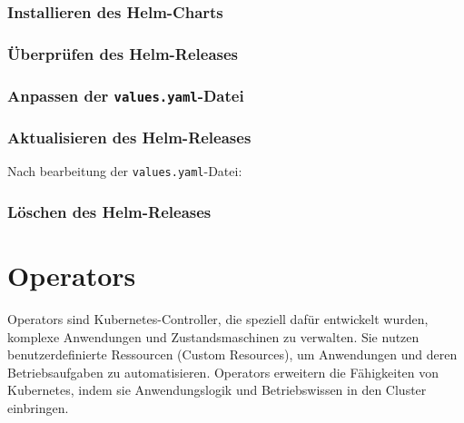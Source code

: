 \subsubsection{Installieren des Helm-Charts}


\subsubsection{Überprüfen des Helm-Releases}


\subsubsection{Anpassen der \texttt{values.yaml}-Datei}



\subsubsection{Aktualisieren des Helm-Releases}
Nach bearbeitung der \texttt{values.yaml}-Datei:


\subsubsection{Löschen des Helm-Releases}


\newpage

\section{Operators}
Operators sind Kubernetes-Controller, die speziell dafür entwickelt wurden, komplexe Anwendungen und Zustandsmaschinen zu verwalten. Sie nutzen benutzerdefinierte Ressourcen (Custom Resources), um Anwendungen und deren Betriebsaufgaben zu automatisieren. Operators erweitern die Fähigkeiten von Kubernetes, indem sie Anwendungslogik und Betriebswissen in den Cluster einbringen.\\

